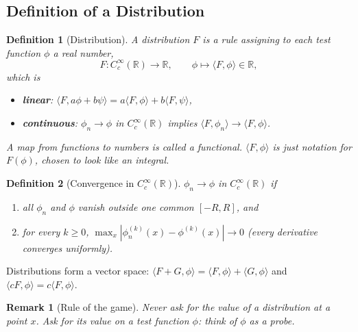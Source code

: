 \documentclass{article}
\newtheorem{definition}{Definition}
\newtheorem{remark}{Remark}
\newcommand{\R}{\mathbb{R}}
\newcommand{\D}{C_c^\infty(\R)}
\newcommand{\ip}[2]{\langle #1, #2 \rangle}
\begin{document}
\subsection{Definition of a Distribution}
\begin{definition}[Distribution]
    A distribution $F$ is a rule assigning to each test function $\phi$ a real number,
    \begin{equation}
        F : \D \to \R, \qquad \phi \mapsto \ip{F}{\phi} \in \R,
    \end{equation}
    which is
    \begin{itemize}
        \item \textbf{linear}: $\ip{F}{a\phi + b\psi} = a\ip{F}{\phi} + b\ip{F}{\psi}$,
        \item \textbf{continuous}: $\phi_n \to \phi$ in $\D$ implies $\ip{F}{\phi_n} \to \ip{F}{\phi}$.
    \end{itemize}
    A map from functions to numbers is called a \emph{functional}. $\ip{F}{\phi}$ is just notation for $F(\phi)$, chosen to look like an integral.
\end{definition}
\begin{definition}[Convergence in $\D$]
    $\phi_n \to \phi$ in $\D$ if
    \begin{enumerate}[label=(\roman*)]
        \item all $\phi_n$ and $\phi$ vanish outside one common $[-R,R]$, and
        \item for every $k \geq 0$, $\max_x |\phi_n^{(k)}(x) - \phi^{(k)}(x)| \to 0$ (every derivative converges uniformly).
    \end{enumerate}
\end{definition}
Distributions form a vector space: $\ip{F+G}{\phi} = \ip{F}{\phi} + \ip{G}{\phi}$ and $\ip{cF}{\phi} = c\ip{F}{\phi}$.
\begin{remark}[Rule of the game]
    Never ask for the value of a distribution at a point $x$. Ask for its value on a test function $\phi$: think of $\phi$ as a probe.
\end{remark}
\end{document}
